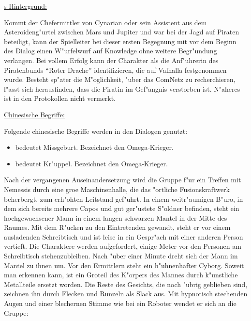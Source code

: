 \begin{remarks}	
	\underline{\xl{}s Hintergrund:}

	Kommt der Chefermittler von Cynarian oder sein Assistent aus dem Asteroideng"urtel zwischen Mars und Jupiter und war bei der Jagd auf Piraten beteiligt, kann der Spielleiter bei dieser ersten Begegnung mit \xl{} vor dem Beginn des Dialog einen W"urfelwurf auf Knowledge ohne weitere Begr"undung verlangen. Bei vollem Erfolg kann der Charakter \xl{} als die Anf"uhrerin des Piratenbunds ``Roter Drache'' identifizieren, die auf Valhalla festgenommen wurde. Besteht sp"ater die M"oglichkeit, "uber das ComNetz zu recherchieren, l"asst sich herausfinden, dass die Piratin im Gef"angnis verstorben ist. N"aheres ist in den Protokollen nicht vermerkt.

	\underline{Chinesische Begriffe:}

	Folgende chinesische Begriffe werden in den Dialogen genutzt:

	\begin{itemize}
		\item {} bedeutet Missgeburt. Bezeichnet den Omega-Krieger.
		\item {} bedeutet Kr"uppel. Bezeichnet den Omega-Krieger.
	\end{itemize}
\end{remarks}



Nach der vergangenen Auseinandersetzung wird die Gruppe f"ur ein Treffen mit Nemessis durch eine gro\3e Maschinenhalle, die das "ortliche Fusionskraftwerk beherbergt, zum erh"ohten Leitstand gef"uhrt. In einem weitr"aumigen B"uro, in dem sich bereits mehrere Capos und gut ger"ustete S"oldner befinden, steht ein hochgewachsener Mann in einem langen schwarzen Mantel in der Mitte des Raumes. Mit dem R"ucken zu den Eintretenden gewandt, steht er vor einem ausladenden Schreibtisch und ist leise in ein Gespr"ach mit einer anderen Person vertieft. Die Charaktere werden aufgefordert, einige Meter vor den Personen am Schreibtisch stehenzubleiben. Nach "uber einer Minute dreht sich der Mann im Mantel zu ihnen um. Vor den Ermittlern steht ein h"uhnenhafter Cyborg. Soweit man erkennen kann, ist ein Gro\3teil des K"orpers des Mannes durch k"unstliche Metallteile ersetzt worden. Die Reste des Gesichts, die noch "ubrig geblieben sind, zeichnen ihn durch Flecken und Runzeln als Slack aus. Mit hypnotisch stechenden Augen und einer blechernen Stimme wie bei ein Roboter wendet er sich an die Gruppe:

